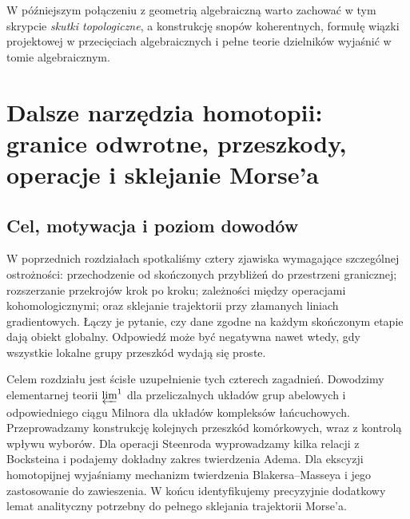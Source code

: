 \documentclass[11pt,a4paper,oneside]{report}
\theoremstyle{plain}
\theoremstyle{definition}
\theoremstyle{remark}
\begin{document}
W późniejszym połączeniu z geometrią algebraiczną
warto zachować w tym skrypcie \emph{skutki topologiczne},
a konstrukcję snopów koherentnych, formułę wiązki
projektowej w przecięciach algebraicznych i pełne
teorie dzielników wyjaśnić w tomie algebraicznym.

\chapter{Dalsze narzędzia homotopii: granice odwrotne, przeszkody, operacje i sklejanie Morse'a}
\label{ch:xviii-domkniecie}

\section{Cel, motywacja i poziom dowodów}
W poprzednich rozdziałach spotkaliśmy cztery zjawiska wymagające
szczególnej ostrożności: przechodzenie od skończonych przybliżeń do
przestrzeni granicznej; rozszerzanie przekrojów krok po kroku; zależności
między operacjami kohomologicznymi; oraz sklejanie trajektorii przy
złamanych liniach gradientowych. Łączy je pytanie, czy dane zgodne na
każdym skończonym etapie dają obiekt globalny. Odpowiedź może być
negatywna nawet wtedy, gdy wszystkie lokalne grupy przeszkód wydają się
proste.

Celem rozdziału jest ścisłe uzupełnienie tych czterech zagadnień.
Dowodzimy elementarnej teorii $\varprojlim^1$ dla przeliczalnych
układów grup abelowych i odpowiedniego ciągu Milnora dla układów
kompleksów łańcuchowych. Przeprowadzamy konstrukcję kolejnych
przeszkód komórkowych, wraz z kontrolą wpływu wyborów. Dla operacji
Steenroda wyprowadzamy kilka relacji z Bocksteina i podajemy dokładny
zakres twierdzenia Adema. Dla ekscyzji homotopijnej wyjaśniamy
mechanizm twierdzenia Blakersa--Masseya i jego zastosowanie do
zawieszenia. W końcu identyfikujemy precyzyjnie dodatkowy lemat
analityczny potrzebny do pełnego sklejania trajektorii Morse'a.
\end{document}
